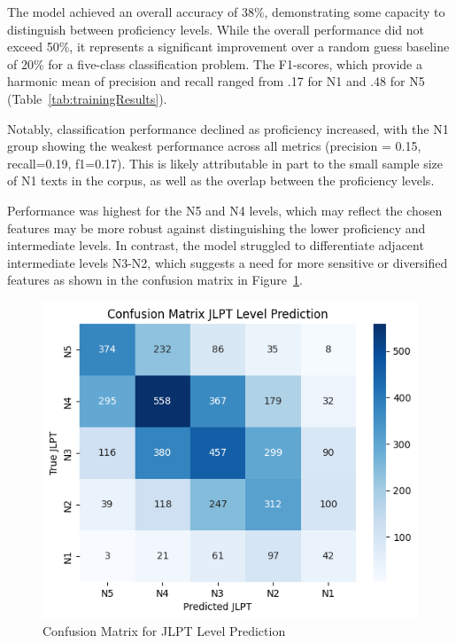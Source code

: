The model achieved an overall accuracy of 38\%, demonstrating some capacity to distinguish between proficiency
levels.
While the overall performance did not exceed 50\%, it represents a significant improvement over a random guess
baseline of 20\% for a five-class classification problem. The F1-scores, which provide a harmonic mean of precision
and recall ranged from .17 for N1 and .48 for N5 (Table~\ref{tab:trainingResults}).

Notably, classification performance declined as proficiency increased, with the N1 group showing the weakest
performance across all metrics (precision = 0.15, recall=0.19, f1=0.17). This is likely attributable in part to the
small sample size of N1 texts in the corpus, as well as the overlap between the proficiency levels.

Performance was highest for the N5 and N4 levels, which may reflect the chosen features may be more robust against
distinguishing the lower proficiency and intermediate levels. In contrast, the model struggled to differentiate
adjacent intermediate levels N3-N2, which suggests a need for more sensitive or diversified features as shown in the
confusion matrix in Figure~\ref{fig:conMA}.

\begin{figure}[h!]
           \centering
           \includegraphics[scale=.4]{img/confusionMatrix}
           \caption[Confusion Matrix for JLPT Level Prediction]{Confusion Matrix for JLPT Level Prediction}
           \label{fig:conMA}
\end{figure}


